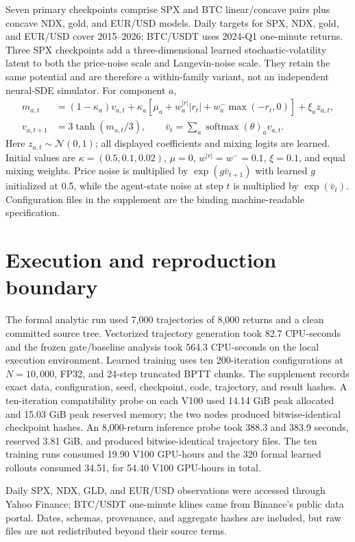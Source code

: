 \documentclass{article}
\begin{document}
Seven primary checkpoints comprise SPX and BTC linear/concave pairs plus concave NDX, gold, and
EUR/USD models. Daily targets for SPX, NDX, gold, and EUR/USD cover 2015--2026; BTC/USDT uses 2024-Q1
one-minute returns. Three SPX checkpoints add a three-dimensional learned stochastic-volatility
latent to both the price-noise scale and Langevin-noise scale. They retain the same potential and are
therefore a within-family variant, not an independent neural-SDE simulator. For component $a$,
\begin{align}
m_{a,t}&=(1-\kappa_a)v_{a,t}
+\kappa_a[\mu_a+w^{|r|}_a|r_t|+w^-_a\max(-r_t,0)]+\xi_a z_{a,t},\\
v_{a,t+1}&=3\tanh(m_{a,t}/3),\qquad
\bar v_t=\sum_a\operatorname{softmax}(\theta)_a v_{a,t}.
\end{align}
Here $z_{a,t}\sim\mathcal{N}(0,1)$; all displayed coefficients and mixing logits are learned.
Initial values are $\kappa=(0.5,0.1,0.02)$, $\mu=0$, $w^{|r|}=w^-=0.1$, $\xi=0.1$, and equal
mixing weights. Price noise is multiplied by $\exp(g\bar v_{t+1})$ with learned $g$ initialized at
0.5, while the agent-state noise at step $t$ is multiplied by $\exp(\bar v_t)$. Configuration files
in the supplement are the binding machine-readable specification.

\section{Execution and reproduction boundary}

The formal analytic run used 7,000 trajectories of 8,000 returns and a clean committed source tree.
Vectorized trajectory generation took 82.7 CPU-seconds and the frozen gate/baseline analysis took
564.3 CPU-seconds on the local execution environment.
Learned training uses ten 200-iteration configurations at $N=10{,}000$, FP32, and 24-step truncated
BPTT chunks. The supplement records exact data, configuration, seed, checkpoint, code, trajectory,
and result hashes. A ten-iteration compatibility probe on each V100 used 14.14 GiB peak allocated
and 15.03 GiB peak reserved memory; the two nodes produced bitwise-identical checkpoint hashes. An
8,000-return inference probe took 388.3 and 383.9 seconds, reserved 3.81 GiB, and produced
bitwise-identical trajectory files. The ten training runs consumed 19.90 V100 GPU-hours and the 320
formal learned rollouts consumed 34.51, for 54.40 V100 GPU-hours in total.

Daily SPX, NDX, GLD, and EUR/USD observations were accessed through Yahoo Finance; BTC/USDT one-minute
klines came from Binance's public data portal. Dates, schemas, provenance, and aggregate hashes are
included, but raw files are not redistributed beyond their source terms.
\end{document}
